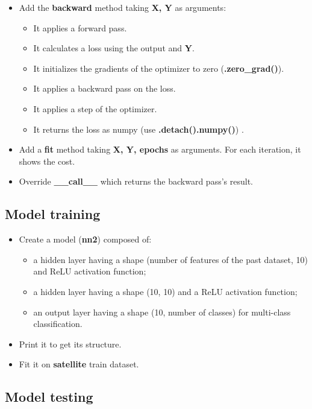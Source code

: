 \documentclass[11pt, a4paper]{article}
\begin{document}
\begin{multicols}{2}
\begin{itemize}
		\item Add the \textbf{backward} method taking \textbf{X, Y} as arguments:
		\begin{itemize} 
			\item It applies a forward pass.
			\item It calculates a loss using the output and \textbf{Y}.
			\item It initializes the gradients of the optimizer to zero (\textbf{.zero\_grad()}).
			\item It applies a backward pass on the loss.
			\item It applies a step of the optimizer.
			\item It returns the loss as numpy (use \textbf{.detach().numpy()}) .
		\end{itemize}
		\item Add a \textbf{fit} method taking \textbf{X, Y, epochs} as arguments.
		For each iteration, it shows the cost.
		\item Override \textbf{\_\_call\_\_} which returns the backward pass's result.
	\end{itemize}
	
	\subsection{Model training} 
	
	\begin{itemize}  
		\item Create a model (\textbf{nn2}) composed of:
		\begin{itemize} 
			\item a hidden layer having a shape (number of features of the past dataset, 10) and ReLU activation function;
			\item a hidden layer having a shape (10, 10) and a ReLU activation function;
			\item an output layer having a shape (10, number of classes) for multi-class classification.
		\end{itemize}
		\item  Print it to get its structure.
		\item Fit it on \textbf{satellite} train dataset.
	\end{itemize}
	
	\subsection{Model testing} 
	

\end{multicols}
\end{document}
